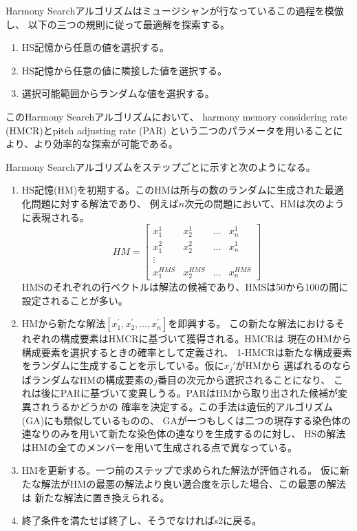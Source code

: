 \documentclass[uplatex]{jsarticle}
\begin{document}
Harmony Searchアルゴリズムはミュージシャンが行なっているこの過程を模倣し、
以下の三つの規則に従って最適解を探索する。
\begin{enumerate}
  \item HS記憶から任意の値を選択する。
  \item HS記憶から任意の値に隣接した値を選択する。
  \item 選択可能範囲からランダムな値を選択する。
\end{enumerate}
このHarmony Searchアルゴリズムにおいて、
harmony memory considering rate (HMCR)とpitch adjusting rate (PAR)
という二つのパラメータを用いることにより、より効率的な探索が可能である。

Harmony Searchアルゴリズムをステップごとに示すと次のようになる。
\begin{enumerate}
  \item HS記憶(HM)を初期する。このHMは所与の数のランダムに生成された最適化問題に対する解法であり、
  例えば$n$次元の問題において、HMは次のように表現される。
  \[
  HM = \left[
    \begin{array}{rrrr}
      x_1^1 & x_2^1 & \dots & x_n^1 \\
      x_1^2 & x_2^2 & \dots & x_n^1 \\
      \vdots \\
      x_1^{HMS} & x_2^{HMS} & \dots & x_n^{HMS}
    \end{array}
  \right]
\]
HMSのそれぞれの行ベクトルは解法の候補であり、HMSは50から100の間に設定されることが多い。
\item HMから新たな解法$[x_1^{\prime},  x_2^{\prime},  \dots,  x_n^{\prime}]$を即興する。
この新たな解法におけるそれぞれの構成要素はHMCRに基づいて獲得される。HMCRは
現在のHMから構成要素を選択するときの確率として定義され、
1-HMCRは新たな構成要素をランダムに生成することを示している。仮に$x_j'$がHMから
選ばれるのならばランダムなHMの構成要素の$j$番目の次元から選択されることになり、
これは後にPARに基づいて変異しうる。PARはHMから取り出された候補が変異されうるかどうかの
確率を決定する。この手法は遺伝的アルゴリズム(GA)にも類似しているものの、
GAが一つもしくは二つの現存する染色体の連なりのみを用いて新たな染色体の連なりを生成するのに対し、
HSの解法はHMの全てのメンバーを用いて生成される点で異なっている。

\item HMを更新する。一つ前のステップで求められた解法が評価される。
仮に新たな解法がHMの最悪の解法より良い適合度を示した場合、この最悪の解法は
新たな解法に置き換えられる。
\item 終了条件を満たせば終了し、そうでなければs2に戻る。
\end{enumerate}
\end{document}
